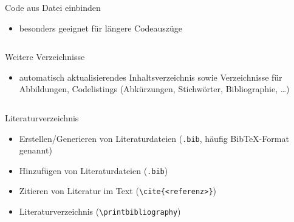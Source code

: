 \documentclass[presentation,aspectratio=169]{beamer}
\begin{document}
\begin{frame}[fragile]{Code aus Datei einbinden}
  \begin{itemize}
    \item besonders geeignet für längere Codeauszüge
  \end{itemize}
  \begin{minipage}{.4\textwidth}
    
  \end{minipage}
  \hfill
  \begin{minipage}{.5\textwidth}
    \inputminted{latex}{codebeispiele/listings-from-file.tex}
  \end{minipage}
\end{frame}

\begin{frame}[fragile]{Weitere Verzeichnisse}
  \begin{itemize}
    \item automatisch aktualisierendes Inhaltsverzeichnis sowie Verzeichnisse für Abbildungen, Codelistings (Abkürzungen, Stichwörter, Bibliographie, \dots)
  \end{itemize}
  \inputminted{latex}{codebeispiele/list-of-everything.tex}
\end{frame}

\begin{frame}[fragile]{Literaturverzeichnis}
  \begin{itemize}
    \item Erstellen/Generieren von Literaturdateien (\verb|.bib|, häufig Bib\TeX{}-Format genannt)
    \item Hinzufügen von Literaturdateien (\verb|.bib|)
    \item Zitieren von Literatur im Text (\verb|\cite{<referenz>}|)
    \item Literaturverzeichnis (\verb|\printbibliography|)
  \end{itemize}
\end{frame}
\end{document}
